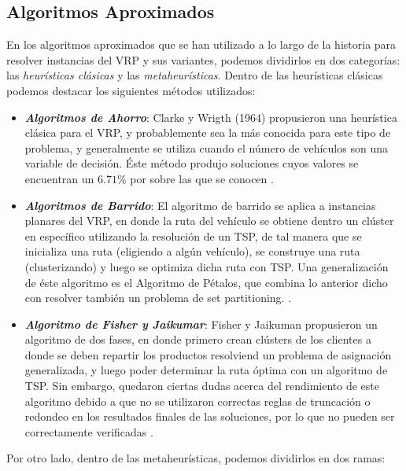 \documentclass[letter, 10pt]{article}
\begin{document}
\subsection{Algoritmos Aproximados}
En los algoritmos aproximados que se han utilizado a lo largo de la historia para resolver instancias del VRP y sus variantes, podemos dividirlos en dos categorías: las \emph{heurísticas clásicas} y las \emph{metaheurísticas}. Dentro de las heurísticas clásicas podemos destacar los siguientes métodos utilizados:

\begin{itemize}
    \item \textbf{\emph{Algoritmos de Ahorro}}: Clarke y Wrigth (1964) propusieron una heurística clásica para el VRP, y probablemente sea la más conocida para este tipo de problema, y generalmente se utiliza cuando el número de vehículos son una variable de decisión. Éste método produjo soluciones cuyos valores se encuentran un $6.71\%$ por sobre las que se conocen \cite{CLASSICHEURISTICS}.
    
    \item \textbf{\emph{Algoritmos de Barrido}}: El algoritmo de barrido se aplica a instancias planares del VRP, en donde la ruta del vehículo se obtiene dentro un clúster en específico utilizando la resolución de un TSP, de tal manera que se inicializa una ruta (eligiendo a algún vehículo), se construye una ruta (clusterizando) y luego se optimiza dicha ruta con TSP. Una generalización de éste algoritmo es el Algoritmo de Pétalos, que combina lo anterior dicho con resolver también un problema de set partitioning. \cite{CLASSICHEURISTICS}.
    
    \item \textbf{\emph{Algoritmo de Fisher y Jaikumar}}: Fisher y Jaikuman propusieron un algoritmo de dos fases, en donde primero crean clústers de los clientes a donde se deben repartir los productos resolviend un problema de asignación generalizada, y luego poder determinar la ruta óptima con un algoritmo de TSP. Sin embargo, quedaron ciertas dudas acerca del rendimiento de este algoritmo debido a que no se utilizaron correctas reglas de truncación o redondeo en los resultados finales de las soluciones, por lo que no pueden ser correctamente verificadas \cite{GUIDETOVRP}.
\end{itemize}
Por otro lado, dentro de las metaheurísticas, podemos dividirlos en dos ramas:
\end{document}
